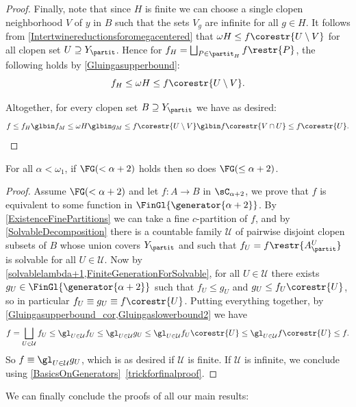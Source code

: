 \begin{proof}
Finally, note that since $H$ is finite we can choose a single clopen neighborhood $V$ of $y$ in $B$ such that the sets $V_g$ are infinite for all $g\in H$.
It follows from \cref{Intertwinereductionsforomegacentered} that $\omega H\leq f\corestr{U\setminus V}$ for all clopen set $U\supseteq Y_\partit$.
Hence for $f_H=\bigsqcup_{P\in \partit_H}f\restr{P}$, the following holds by \cref{Gluingasupperbound}:
\[
f_H \leq \omega H \leq f\corestr{U\setminus V}.
\]

Altogether, for every clopen set $B\supseteq Y_\partit$ we have as desired: 
\[
f \leq f_H \glbin f_M \leq \omega H \glbin g_M \leq f\corestr{U\setminus V} \glbin f\corestr{V\cap U} \leq f\corestr{U}.\qedhere
\]
\end{proof}

\begin{theorem}\label{FGatdoublesuccessors}
For all $\alpha<\omega_1$, if $\FG(<\alpha+2)$ holds then so does $\FG(\leq\alpha+2)$.
\end{theorem}

\begin{proof}
Assume $\FG(<\alpha+2)$ and let $f:A\to B$ in $\sC_{\alpha+2}$, we prove that $f$ is equivalent to some function in $\FinGl{\generator{\alpha+2}}$.
By \cref{ExistenceFinePartitions} we can take a fine $c$-partition of $f$, and by \cref{SolvableDecomposition} there is a countable family $\mathcal{U}$
of pairwise disjoint clopen subsets of $B$ whose union covers $Y_\partit$ and such that $f_U=f\restr{A^U_\partit}$ is solvable for all $U\in \mathcal{U}$.
Now by \cref{solvablelambda+1,FiniteGenerationForSolvable}, for all $U\in \mathcal{U}$ there exists $g_U\in \FinGl{\generator{\alpha+2}}$
such that $f_U\leq g_U$ and $g_U\leq f_U\corestr{U}$, so in particular $f_U\equiv g_U \equiv f\corestr{U}$.
Putting everything together, by \cref{Gluingasupperbound_cor,Gluingaslowerbound2} we have
\[
f=\bigsqcup_{U\in\mathcal{U}}f_U\leq\gl_{U\in\mathcal{U}}f_U\leq\gl_{U\in\mathcal{U}}g_U\leq\gl_{U\in\mathcal{U}}{f_U}\corestr{U}\leq\gl_{U\in\mathcal{U}}f\corestr{U}\leq f.
\]
So $f\equiv\gl_{U\in\mathcal{U}}g_U$, which is as desired if $\mathcal{U}$ is finite. If $\mathcal{U}$ is infinite, we conclude using \cref{BasicsOnGenerators}~\cref{trickforfinalproof}.
\end{proof}

We can finally conclude the proofs of all our main results:

